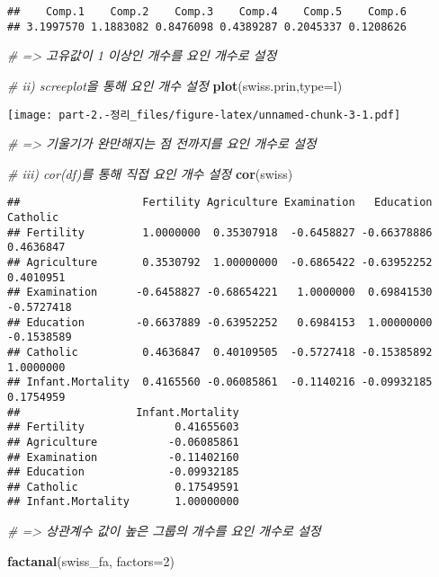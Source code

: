 \documentclass[
]{article}
\newenvironment{Shaded}{\begin{snugshade}}{\end{snugshade}}
\newcommand{\AttributeTok}[1]{\textcolor[rgb]{0.13,0.29,0.53}{#1}}
\newcommand{\CommentTok}[1]{\textcolor[rgb]{0.56,0.35,0.01}{\textit{#1}}}
\newcommand{\DecValTok}[1]{\textcolor[rgb]{0.00,0.00,0.81}{#1}}
\newcommand{\FunctionTok}[1]{\textcolor[rgb]{0.13,0.29,0.53}{\textbf{#1}}}
\newcommand{\NormalTok}[1]{#1}
\newcommand{\StringTok}[1]{\textcolor[rgb]{0.31,0.60,0.02}{#1}}
\begin{document}
\begin{verbatim}
##    Comp.1    Comp.2    Comp.3    Comp.4    Comp.5    Comp.6 
## 3.1997570 1.1883082 0.8476098 0.4389287 0.2045337 0.1208626
\end{verbatim}

\begin{Shaded}
\begin{Highlighting}[]
\CommentTok{\# =\textgreater{} 고유값이 1 이상인 개수를 요인 개수로 설정}

\CommentTok{\# ii) screeplot을 통해 요인 개수 설정}
\FunctionTok{plot}\NormalTok{(swiss.prin,}\AttributeTok{type=}\StringTok{\textquotesingle{}l\textquotesingle{}}\NormalTok{)}
\end{Highlighting}
\end{Shaded}

\texttt{[image: part-2.-정리\_files/figure-latex/unnamed-chunk-3-1.pdf]}

\begin{Shaded}
\begin{Highlighting}[]
\CommentTok{\# =\textgreater{} 기울기가 완만해지는 점 전까지를 요인 개수로 설정}

\CommentTok{\# iii) cor(df)를 통해 직접 요인 개수 설정}
\FunctionTok{cor}\NormalTok{(swiss)}
\end{Highlighting}
\end{Shaded}

\begin{verbatim}
##                   Fertility Agriculture Examination   Education   Catholic
## Fertility         1.0000000  0.35307918  -0.6458827 -0.66378886  0.4636847
## Agriculture       0.3530792  1.00000000  -0.6865422 -0.63952252  0.4010951
## Examination      -0.6458827 -0.68654221   1.0000000  0.69841530 -0.5727418
## Education        -0.6637889 -0.63952252   0.6984153  1.00000000 -0.1538589
## Catholic          0.4636847  0.40109505  -0.5727418 -0.15385892  1.0000000
## Infant.Mortality  0.4165560 -0.06085861  -0.1140216 -0.09932185  0.1754959
##                  Infant.Mortality
## Fertility              0.41655603
## Agriculture           -0.06085861
## Examination           -0.11402160
## Education             -0.09932185
## Catholic               0.17549591
## Infant.Mortality       1.00000000
\end{verbatim}

\begin{Shaded}
\begin{Highlighting}[]
\CommentTok{\# =\textgreater{} 상관계수 값이 높은 그룹의 개수를 요인 개수로 설정}

\FunctionTok{factanal}\NormalTok{(swiss\_fa, }\AttributeTok{factors=}\DecValTok{2}\NormalTok{)}
\end{Highlighting}
\end{Shaded}
\end{document}
